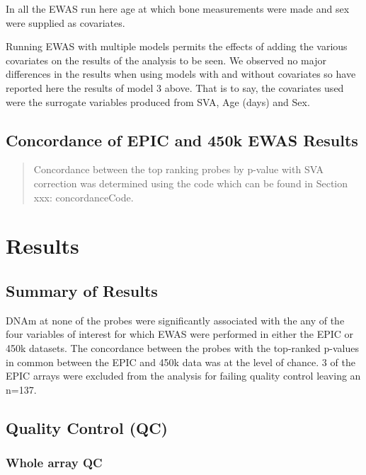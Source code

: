 \documentclass[
]{book}
\begin{document}
In all the EWAS run here age at which bone measurements were made and sex were supplied as covariates.

Running EWAS with multiple models permits the effects of adding the various covariates on the results of the analysis to be seen.
We observed no major differences in the results when using models with and without covariates so have reported here the results of model 3 above.
That is to say, the covariates used were the surrogate variables produced from SVA, Age (days) and Sex.

\hypertarget{concordance-of-epic-and-450k-ewas-results}{%
\subsection{Concordance of EPIC and 450k EWAS Results}\label{concordance-of-epic-and-450k-ewas-results}}

\begin{quote}
Concordance between the top ranking probes by p-value with SVA correction was determined using the code which can be found in Section xxx: concordanceCode.
\end{quote}

\hypertarget{results}{%
\section{Results}\label{results}}

\hypertarget{summary-of-results}{%
\subsection{Summary of Results}\label{summary-of-results}}

DNAm at none of the probes were significantly associated with the any of the four variables of interest for which EWAS were performed in either the EPIC or 450k datasets.
The concordance between the probes with the top-ranked p-values in common between the EPIC and 450k data was at the level of chance.
3 of the EPIC arrays were excluded from the analysis for failing quality control leaving an n=137.

\hypertarget{quality-control-qc}{%
\subsection{Quality Control (QC)}\label{quality-control-qc}}

\hypertarget{whole-array-qc}{%
\subsubsection{Whole array QC}\label{whole-array-qc}}
\end{document}
